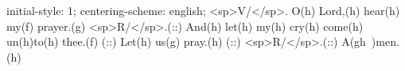 initial-style: 1;
centering-scheme: english;
<sp>V/</sp>. O(h) Lord,(h) hear(h) my(f) prayer.(g) <sp>R/</sp>.(::) And(h) let(h) my(h) cry(h) come(h) un(h)to(h) thee.(f) (::) Let(h) us(g) pray.(h) (::) <sp>R/</sp>.(::) A(gh~)men.(h)

